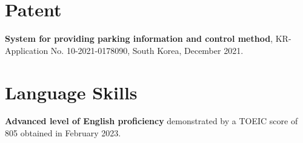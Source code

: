 \documentclass[letterpaper,11pt]{article}
\begin{document}
    \section{Patent}
    \begin{enumerate}[noitemsep, leftmargin=*,label={[\arabic*]}]
        \item{\textbf{System for providing parking information and control method}, KR-Application No. 10-2021-0178090, South Korea, December 2021.}
    \end{enumerate}

    \section{Language Skills}
    {\textbf{Advanced level of English proficiency} demonstrated by a TOEIC score of 805 obtained in February 2023.} 
\end{document}
